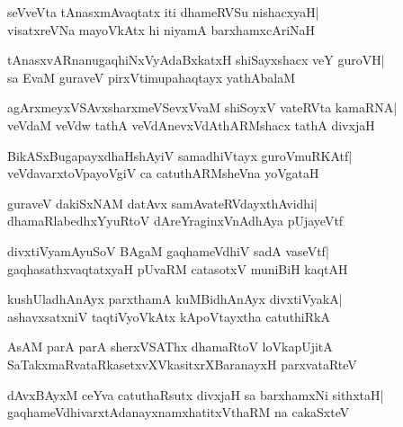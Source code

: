 \documentclass[twoside,12pt,openright]{book}
\newcounter{shloka}[chapter]
\begin{document}
\begin{shloka}%
seVveVta tAnasxmAvaqtatx iti dhameRVSu nishacxyaH|\\
visatxreVNa mayoVkAtx hi niyamA barxhamxcAriNaH
\end{shloka}

\begin{shloka}%
tAnasxvARnanugaqhiNxVyAdaBxkatxH shiSayxshacx veY guroVH|\\
sa EvaM guraveV pirxVtimupahaqtayx yathAbalaM
\end{shloka}

\begin{shloka}%
agArxmeyxVSAvxsharxmeVSevxVvaM shiSoyxV vateRVta kamaRNA|\\
veVdaM veVdw tathA veVdAnevxVdAthARMshacx tathA divxjaH
\end{shloka}

\begin{shloka}%
BikASxBugapayxdhaHshAyiV samadhiVtayx guroVmuRKAtf|\\
veVdavarxtoVpayoVgiV ca catuthARMsheVna yoVgataH
\end{shloka}

\begin{shloka}%
guraveV dakiSxNAM datAvx samAvateRVdayxthAvidhi|\\
dhamaRlabedhxYyuRtoV dAreYraginxVnAdhAya pUjayeVtf
\end{shloka}

\begin{shloka}%
divxtiVyamAyuSoV BAgaM gaqhameVdhiV sadA vaseVtf|\\
gaqhasathxvaqtatxyaH pUvaRM catasotxV muniBiH kaqtAH
\end{shloka}

\begin{shloka}%
kushUladhAnAyx parxthamA kuMBidhAnAyx divxtiVyakA|\\
ashavxsatxniV taqtiVyoVkAtx kApoVtayxtha catuthiRkA
\end{shloka}

\begin{shloka}%
AsAM parA parA sherxVSAThx dhamaRtoV loVkapUjitA\\
SaTakxmaRvataRkasetxvXVkasitxrXBaranayxH parxvataRteV
\end{shloka}

\begin{shloka}%
dAvxBAyxM ceYva catuthaRsutx divxjaH sa barxhamxNi sithxtaH|\\
gaqhameVdhivarxtAdanayxnamxhatitxVthaRM na cakaSxteV
\end{shloka}
\end{document}
